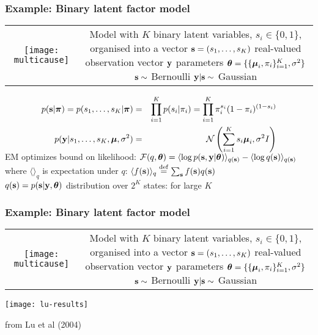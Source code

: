 \begin{frame}
\frametitle{Example: Binary latent factor model}
\begin{tabular}{cc}
\texttt{[image: multicause]} & \raisebox{0.45in}{\parbox{2.9in}{
Model with $K$ binary latent variables, $s_i\in\{0,1\}$, \\[1ex]
organised into a vector $\mathbf s=(s_1, \ldots, s_K)$ \\
real-valued observation vector $\mathbf y$ \\
parameters $\boldsymbol{\theta}=\{ \{ {\boldsymbol{\mu}}_i, \pi_i\}_{i=1}^K, \sigma^2\}$ \\[2ex]
$\mathbf s \sim$ Bernoulli \\ 
$\mathbf y | \mathbf s  \sim$ Gaussian  
}} 
\end{tabular}
\vspace*{-2.5ex}
\begin{eqnarray*}
p(\mathbf s|\boldsymbol{\pi}) = p(s_1, \ldots, s_K|\boldsymbol{\pi}) &=& \prod_{i=1}^K p(s_i|\pi_i) = \prod_{i=1}^K
\pi_i^{s_i} (1-\pi_i)^{(1-s_i)}  \\
p(\mathbf y|s_1, \ldots, s_K,{\boldsymbol{\mu}},\sigma^2) &=& {\cal N}\left(\sum_{i=1}^K s_i {\boldsymbol{\mu}}_i,
\sigma^2 I\right)  \\[-2ex]
\end{eqnarray*}
EM optimizes bound on likelihood: \hfill $ \displaystyle
{\cal F}(q,\boldsymbol{\theta}) = \langle \log p(\mathbf s, \mathbf y|\boldsymbol{\theta})\rangle_{q(\mathbf s)} -
\langle \log q(\mathbf s) \rangle_{q(\mathbf s)} 
$ \\
where $\langle \rangle_q$ is expectation under $q$:  \hspace{2em} $\langle
f(\mathbf s)\rangle_q \stackrel{\mathrm{def}}{=} \sum_{\mathbf s} f(\mathbf s) q(\mathbf s)$ \\[1.5ex]

 $q(\mathbf s) = p(\mathbf s|\mathbf y,\boldsymbol{\theta})$ distribution
over $2^K$ states:  for large $K$ 

\end{frame}
\begin{frame}
\frametitle{Example: Binary latent factor model}
\begin{tabular}{cc}
\texttt{[image: multicause]} & \raisebox{0.45in}{\parbox{2.9in}{
Model with $K$ binary latent variables, $s_i\in\{0,1\}$, \\[1ex]
organised into a vector $\mathbf s=(s_1, \ldots, s_K)$ \\
real-valued observation vector $\mathbf y$ \\
parameters $\boldsymbol{\theta}=\{ \{ {\boldsymbol{\mu}}_i, \pi_i\}_{i=1}^K, \sigma^2\}$ \\[2ex]
$\mathbf s \sim$ Bernoulli \\ 
$\mathbf y | \mathbf s  \sim$ Gaussian 
}} 
\end{tabular}

\centerline{\texttt{[image: lu-results]}}

\centerline{\small from Lu et al (2004)}
\end{frame}
